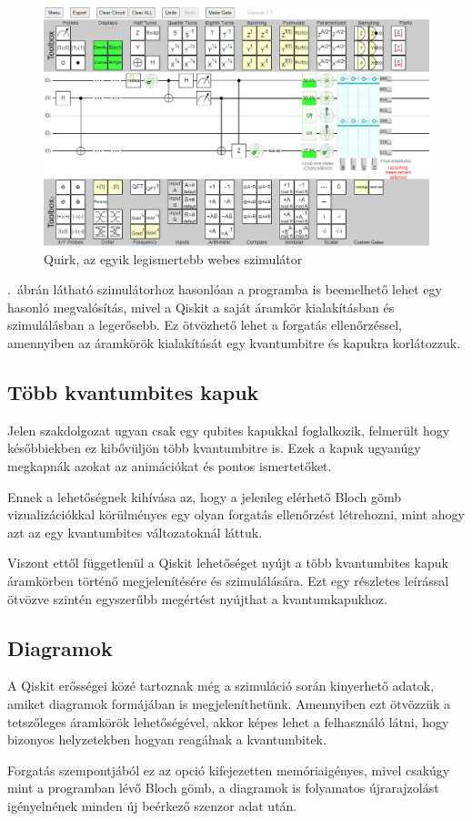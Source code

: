 \documentclass[
]{thesis-ekf}
\theoremstyle{definition}
\theoremstyle{remark}
\begin{document}
\begin{figure}[H]
	\centering
	\includegraphics[width=0.5\linewidth]{Simulation}
	\caption{Quirk, az egyik legismertebb webes szimulátor}
	\label{fig:simulation}
\end{figure}

\Az{\ref{fig:simulation}}.~ábrán látható szimulátorhoz hasonlóan a programba is beemelhető lehet egy hasonló megvalósítás, mivel a Qiskit a saját áramkör kialakításban és szimulálásban a legerősebb. Ez ötvözhető lehet a forgatás ellenőrzéssel, amennyiben az áramkörök kialakítását egy kvantumbitre és kapukra korlátozzuk.

\subsection{Több kvantumbites kapuk}
Jelen szakdolgozat ugyan csak egy qubites kapukkal foglalkozik, felmerült hogy későbbiekben ez kibővüljön több kvantumbitre is. Ezek a kapuk ugyanúgy megkapnák azokat az animációkat és pontos ismertetőket.

Ennek a lehetőségnek kihívása az, hogy a jelenleg elérhető Bloch gömb vizualizációkkal körülményes egy olyan forgatás ellenőrzést létrehozni, mint ahogy azt az egy kvantumbites változatoknál láttuk.

Viszont ettől függetlenül a Qiskit lehetőséget nyújt a több kvantumbites kapuk áramkörben történő megjelenítésére és szimulálására. Ezt egy részletes leírással ötvözve szintén egyszerűbb megértést nyújthat a kvantumkapukhoz.

\subsection{Diagramok}
A Qiskit erősségei közé tartoznak még a szimuláció során kinyerhető adatok, amiket diagramok formájában is megjeleníthetünk. Amennyiben ezt ötvözzük a tetszőleges áramkörök lehetőségével, akkor képes lehet a felhasználó látni, hogy bizonyos helyzetekben hogyan reagálnak a kvantumbitek.

Forgatás szempontjából ez az opció kifejezetten memóriaigényes, mivel csakúgy mint a programban lévő Bloch gömb, a diagramok is folyamatos újrarajzolást igényelnének minden új beérkező szenzor adat után.
\end{document}

